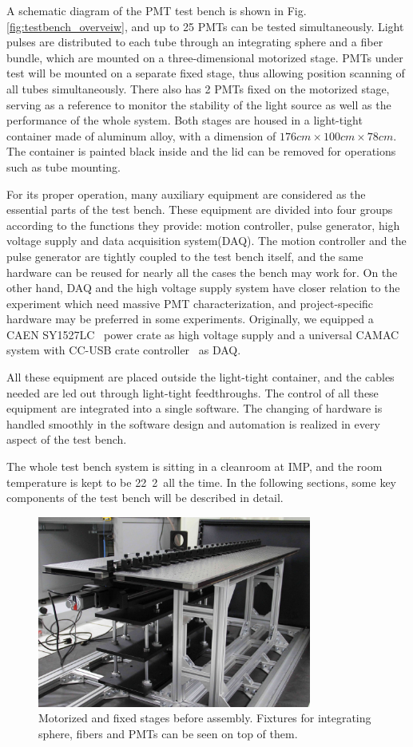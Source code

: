 \documentclass[5p, times]{elsarticle}
\begin{document}
A schematic diagram of the PMT test bench is shown in Fig.\ref{fig:testbench_overveiw}, and up to 25 PMTs can be tested simultaneously.
Light pulses are distributed to each tube through an integrating sphere and a fiber bundle, which are mounted on a three-dimensional motorized stage.
PMTs under test will be mounted on a separate fixed stage, thus allowing position scanning of all tubes simultaneously.
There also has 2 PMTs fixed on the motorized stage, serving as a reference to monitor the stability of the light source as well as the performance of the whole system.
Both stages are housed in a light-tight container made of aluminum alloy, with a dimension of $176cm\times100cm\times78cm$.
The container is painted black inside and the lid can be removed for operations such as tube mounting.

For its proper operation, many auxiliary equipment are considered as the essential parts of the test bench. These equipment are divided into four groups according to the functions they provide: motion controller, pulse generator, high voltage supply and data acquisition system(DAQ).
The motion controller and the pulse generator are tightly coupled to the test bench itself, and the same hardware can be reused for nearly all the cases the bench may work for.
On the other hand, DAQ and the high voltage supply system have closer relation to the experiment which need massive PMT characterization, and project-specific hardware may be preferred in some experiments. Originally, we equipped a CAEN SY1527LC~\cite{sy1527lc} power crate as high voltage supply and a universal CAMAC system with CC-USB crate controller~\cite{cc_usb} as DAQ.

All these equipment are placed outside the light-tight container, and the cables needed are led out through light-tight feedthroughs.
The control of all these equipment are integrated into a single software. The changing of hardware is handled smoothly in the software design and automation is realized in every aspect of the test bench.

The whole test bench system is sitting in a cleanroom at IMP, and the room temperature is kept to be 22\textpm~2\textcelsius~all the time. 
In the following sections, some key components of the test bench will be described in detail.

\begin{figure}
 \centering
 \includegraphics[width=90mm]{stage1_crop}
\caption{Motorized and fixed stages before assembly.
Fixtures for integrating sphere, fibers and PMTs can be seen on top of them.}
\label{fig:stages}
\end{figure} 
\end{document}

